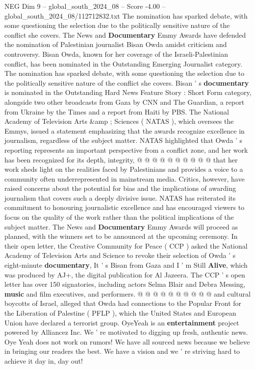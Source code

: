 \begin{textsample}{NEG Dim 9 – global\_south\_2024\_08 – Score -4.00 – global\_south\_2024\_08/112712832.txt}  \label{ex:f9_neg_387}
The nomination has sparked debate, with some questioning the selection due to the politically sensitive nature of the conflict she covers.
The News and \textbf{Documentary} Emmy Awards have defended the nomination of Palestinian journalist Bisan Owda amidst criticism and controversy.
Bisan Owda, known for her coverage of the Israeli-Palestinian conflict, has been nominated in the Outstanding Emerging Journalist category.
The nomination has sparked debate, with some questioning the selection due to the politically sensitive nature of the conflict she covers.
Bisan ' s \textbf{documentary} is nominated in the Outstanding Hard News Feature Story : Short Form category, alongside two other broadcasts from Gaza by CNN and The Guardian, a report from Ukraine by the Times and a report from Haiti by PBS.
The National Academy of Television Arts \&amp ; Sciences ( NATAS ), which oversees the Emmys, issued a statement emphasizing that the awards recognize excellence in journalism, regardless of the subject matter.
NATAS highlighted that Owda ' s reporting represents an important perspective from a conflict zone, and her work has been recognized for its depth, integrity, @ @ @ @ @ @ @ @ @ @ that her work sheds light on the realities faced by Palestinians and provides a voice to a community often underrepresented in mainstream media.
Critics, however, have raised concerns about the potential for bias and the implications of awarding journalism that covers such a deeply divisive issue.
NATAS has reiterated its commitment to honouring journalistic excellence and has encouraged viewers to focus on the quality of the work rather than the political implications of the subject matter.
The News and \textbf{Documentary} Emmy Awards will proceed as planned, with the winners set to be announced at the upcoming ceremony.
In their open letter, the Creative Community for Peace ( CCP ) asked the National Academy of Television Arts and Science to revoke their selection of Owda ' s eight-minute \textbf{documentary}, It ' s Bisan from Gaza and I ' m Still \textbf{Alive}, which was produced by AJ+, the digital publication for Al Jazeera.
The CCP ' s open letter has over 150 signatories, including actors Selma Blair and Debra Messing, \textbf{music} and film executives, and performers. @ @ @ @ @ @ @ @ @ @ and cultural boycotts of Israel, alleged that Owda had connections to the Popular Front for the Liberation of Palestine ( PFLP ), which the United States and European Union have declared a terrorist group.
OyeYeah is an \textbf{entertainment} project powered by Alliancez Inc.
We ' re motivated to digging up fresh, authentic news.
Oye Yeah does not work on rumors!
We have all sourced news because we believe in bringing our readers the best.
We have a vision and we ' re striving hard to achieve it day in, day out!

\end{textsample}
